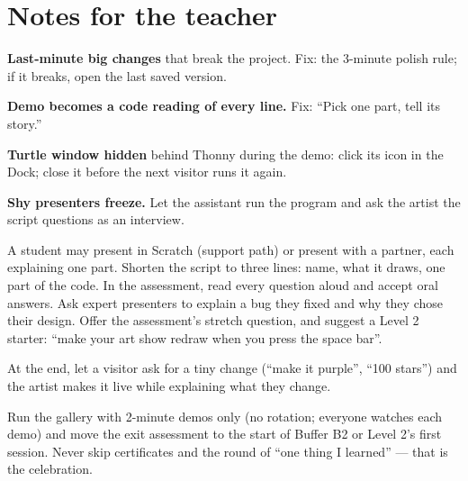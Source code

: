 \section{Notes for the teacher}
\begin{commonmistakes}
  \item \textbf{Last-minute big changes} that break the project. Fix: the 3-minute polish rule; if it breaks, open the last saved version.
  \item \textbf{Demo becomes a code reading of every line.} Fix: \enquote{Pick one part, tell its story.}
  \item \textbf{Turtle window hidden} behind Thonny during the demo: click its icon in the Dock; close it before the next visitor runs it again.
  \item \textbf{Shy presenters freeze.} Let the assistant run the program and ask the artist the script questions as an interview.
\end{commonmistakes}
\begin{differentiation}
\supportpath A student may present in Scratch (support path) or present with a partner, each explaining one part. Shorten the script to three lines: name, what it draws, one part of the code. In the assessment, read every question aloud and accept oral answers.
\extensionpath Ask expert presenters to explain a bug they fixed and why they chose their design. Offer the assessment's stretch question, and suggest a Level 2 starter: \enquote{make your art show redraw when you press the space bar}.
\end{differentiation}
\begin{stretchchallenge}
At the end, let a visitor ask for a tiny change (\enquote{make it purple}, \enquote{100 stars}) and the artist makes it live while explaining what they change.
\end{stretchchallenge}
\begin{teachernote}
Run the gallery with 2-minute demos only (no rotation; everyone watches each demo) and move the exit assessment to the start of Buffer B2 or Level 2's first session. Never skip certificates and the round of \enquote{one thing I learned} --- that is the celebration.
\end{teachernote}
